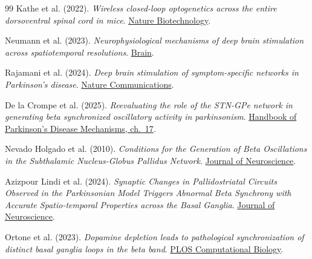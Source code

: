 ﻿\documentclass[11pt,a4paper]{article}
\begin{document}
\begin{thebibliography}{99}
Kathe et al. (2022).
\emph{Wireless closed-loop optogenetics across the entire dorsoventral
spinal cord in mice}.
\href{https://doi.org/10.1038/s41587-021-01019-x}{Nature Biotechnology}.

Neumann et al. (2023).
\emph{Neurophysiological mechanisms of deep brain stimulation across
spatiotemporal resolutions}.
\href{https://doi.org/10.1093/brain/awad239}{Brain}.

Rajamani et al. (2024).
\emph{Deep brain stimulation of symptom-specific networks in
Parkinson's disease}.
\href{https://doi.org/10.1038/s41467-024-48731-1}{Nature Communications}.

De la Crompe et al. (2025).
\emph{Reevaluating the role of the STN-GPe network in generating beta
synchronized oscillatory activity in parkinsonism}.
\href{https://doi.org/10.1016/B978-0-443-21992-4.00013-0}{Handbook of Parkinson's Disease Mechanisms, ch.~17}.

Nevado Holgado et al. (2010).
\emph{Conditions for the Generation of Beta Oscillations in the
Subthalamic Nucleus-Globus Pallidus Network}.
\href{https://doi.org/10.1523/JNEUROSCI.0817-10.2010}{Journal of Neuroscience}.

Azizpour Lindi et al. (2024).
\emph{Synaptic Changes in Pallidostriatal Circuits Observed in the
Parkinsonian Model Triggers Abnormal Beta Synchrony with Accurate
Spatio-temporal Properties across the Basal Ganglia}.
\href{https://doi.org/10.1523/JNEUROSCI.0419-23.2023}{Journal of Neuroscience}.

Ortone et al. (2023).
\emph{Dopamine depletion leads to pathological synchronization of
distinct basal ganglia loops in the beta band}.
\href{https://doi.org/10.1371/journal.pcbi.1010645}{PLOS Computational Biology}.
\end{thebibliography}
\endgroup
\end{document}
